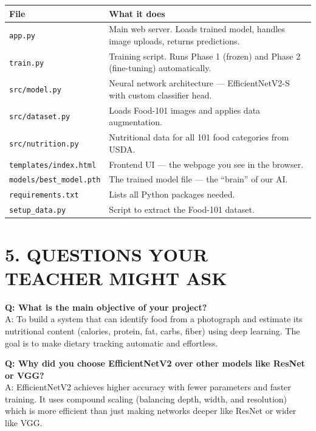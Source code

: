\documentclass[11pt,a4paper]{article}
\begin{document}
\begin{tabularx}{\textwidth}{l X}
\toprule
\textbf{File} & \textbf{What it does} \\
\midrule
\texttt{app.py} & Main web server. Loads trained model, handles image uploads, returns predictions. \\
\texttt{train.py} & Training script. Runs Phase 1 (frozen) and Phase 2 (fine-tuning) automatically. \\
\texttt{src/model.py} & Neural network architecture --- EfficientNetV2-S with custom classifier head. \\
\texttt{src/dataset.py} & Loads Food-101 images and applies data augmentation. \\
\texttt{src/nutrition.py} & Nutritional data for all 101 food categories from USDA. \\
\texttt{templates/index.html} & Frontend UI --- the webpage you see in the browser. \\
\texttt{models/best\_model.pth} & The trained model file --- the ``brain'' of our AI. \\
\texttt{requirements.txt} & Lists all Python packages needed. \\
\texttt{setup\_data.py} & Script to extract the Food-101 dataset. \\
\bottomrule
\end{tabularx}

\newpage
\section{5. QUESTIONS YOUR TEACHER MIGHT ASK}

\begin{qabox}
\textbf{Q: What is the main objective of your project?}\\[0.2cm]
A: To build a system that can identify food from a photograph and estimate its nutritional content (calories, protein, fat, carbs, fiber) using deep learning. The goal is to make dietary tracking automatic and effortless.
\end{qabox}

\vspace{0.3cm}

\begin{qabox}
\textbf{Q: Why did you choose EfficientNetV2 over other models like ResNet or VGG?}\\[0.2cm]
A: EfficientNetV2 achieves higher accuracy with fewer parameters and faster training. It uses compound scaling (balancing depth, width, and resolution) which is more efficient than just making networks deeper like ResNet or wider like VGG.
\end{qabox}
\end{document}
